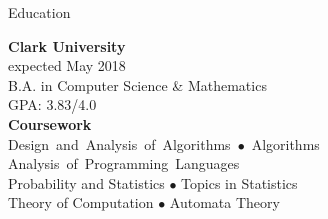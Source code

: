 \documentclass{resume} %
\newcommand{\mybullet}[0]{\textcolor{mygray}{$\bullet$} }
\begin{document}

\begin{rSection}{Education}

\begin{vwcol}[widths={0.45, 0.55}, indent=0pt, rule=0pt]
\textcolor{jobcolor}{\textbf{Clark University}}\\
\textcolor{mygray}{expected May 2018} \\
B.A. in Computer Science \& Mathematics \\
GPA: 3.83/4.0  \smallskip \\

\textcolor{jobcolor}{\textbf{Coursework}} \\ \mbox{Design and Analysis of Algorithms \mybullet Algorithms}\\
\mbox{Analysis of Programming Languages}\\ Probability and Statistics \mybullet Topics in Statistics\\
Theory of Computation \mybullet Automata Theory

\end{vwcol}

\end{rSection}

\end{document}
